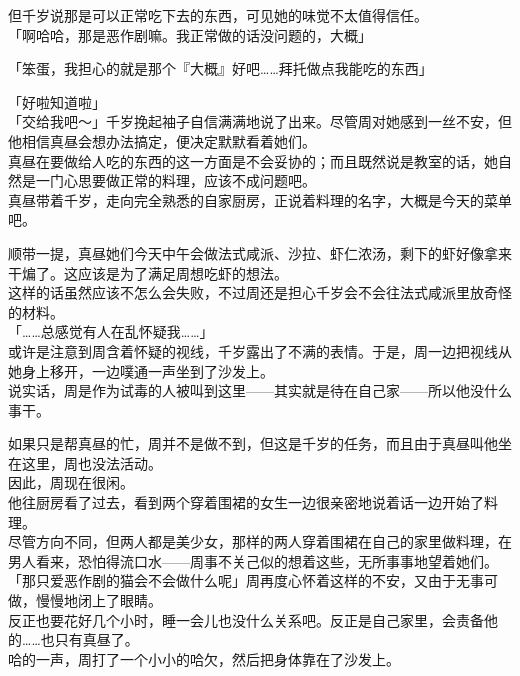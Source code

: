 但千岁说那是可以正常吃下去的东西，可见她的味觉不太值得信任。\\

「啊哈哈，那是恶作剧嘛。我正常做的话没问题的，大概」

「笨蛋，我担心的就是那个『大概』好吧……拜托做点我能吃的东西」

「好啦知道啦」\\

「交给我吧～」千岁挽起袖子自信满满地说了出来。尽管周对她感到一丝不安，但他相信真昼会想办法搞定，便决定默默看着她们。\\

真昼在要做给人吃的东西的这一方面是不会妥协的；而且既然说是教室的话，她自然是一门心思要做正常的料理，应该不成问题吧。\\

真昼带着千岁，走向完全熟悉的自家厨房，正说着料理的名字，大概是今天的菜单吧。

顺带一提，真昼她们今天中午会做法式咸派、沙拉、虾仁浓汤，剩下的虾好像拿来干煸了。这应该是为了满足周想吃虾的想法。\\

这样的话虽然应该不怎么会失败，不过周还是担心千岁会不会往法式咸派里放奇怪的材料。\\

「……总感觉有人在乱怀疑我……」\\

或许是注意到周含着怀疑的视线，千岁露出了不满的表情。于是，周一边把视线从她身上移开，一边噗通一声坐到了沙发上。\\

说实话，周是作为试毒的人被叫到这里——其实就是待在自己家——所以他没什么事干。

如果只是帮真昼的忙，周并不是做不到，但这是千岁的任务，而且由于真昼叫他坐在这里，周也没法活动。\\

因此，周现在很闲。\\

他往厨房看了过去，看到两个穿着围裙的女生一边很亲密地说着话一边开始了料理。\\

尽管方向不同，但两人都是美少女，那样的两人穿着围裙在自己的家里做料理，在男人看来，恐怕得流口水——周事不关己似的想着这些，无所事事地望着她们。\\

「那只爱恶作剧的猫会不会做什么呢」周再度心怀着这样的不安，又由于无事可做，慢慢地闭上了眼睛。\\

反正也要花好几个小时，睡一会儿也没什么关系吧。反正是自己家里，会责备他的……也只有真昼了。\\

哈的一声，周打了一个小小的哈欠，然后把身体靠在了沙发上。
